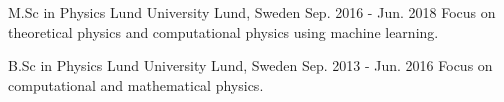 


\begin{cventries}


\cventry
{M.Sc in Physics} %
{Lund University} %
{Lund, Sweden} %
{Sep. 2016 - Jun. 2018} %
{ %
  Focus on theoretical physics and computational physics using machine
  learning.
}

\cventry
{B.Sc in Physics} %
{Lund University} %
{Lund, Sweden} %
{Sep. 2013 - Jun. 2016} %
{ %
  Focus on computational and mathematical physics.
}


\end{cventries}
